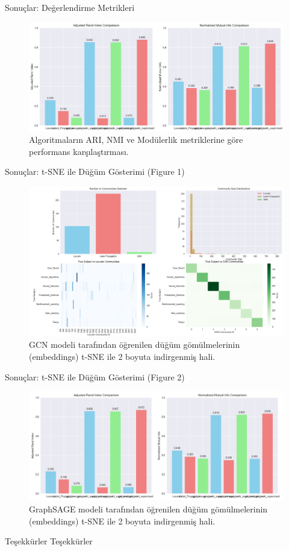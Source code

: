 \documentclass{beamer}
\begin{document}
\begin{frame}{Sonuçlar: Değerlendirme Metrikleri}
    \begin{figure}
        \includegraphics[width=\textwidth]{../results/evaluation_metrics.png}
        \caption{Algoritmaların ARI, NMI ve Modülerlik metriklerine göre performans karşılaştırması.}
    \end{figure}
\end{frame}

\begin{frame}{Sonuçlar: t-SNE ile Düğüm Gösterimi (Figure 1)}
    \begin{figure}
        \includegraphics[width=\textwidth]{../results/Figure_1.png}
        \caption{GCN modeli tarafından öğrenilen düğüm gömülmelerinin (embeddings) t-SNE ile 2 boyuta indirgenmiş hali.}
    \end{figure}
\end{frame}

\begin{frame}{Sonuçlar: t-SNE ile Düğüm Gösterimi (Figure 2)}
    \begin{figure}
        \includegraphics[width=\textwidth]{../results/Figure_2.png}
        \caption{GraphSAGE modeli tarafından öğrenilen düğüm gömülmelerinin (embeddings) t-SNE ile 2 boyuta indirgenmiş hali.}
    \end{figure}
\end{frame}

\begin{frame}{Teşekkürler}
    \centering
    \Huge
    Teşekkürler
\end{frame}
\end{document}
